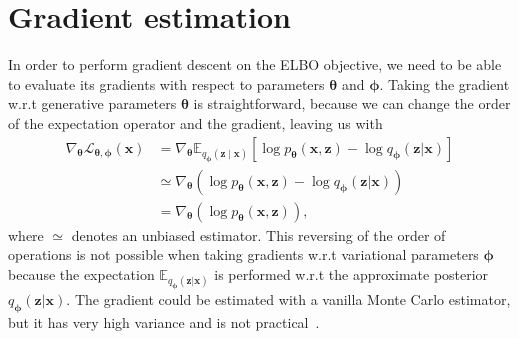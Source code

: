 
\chapter{Gradient estimation}
\label{app:grad_estim}
In order to perform gradient descent on the ELBO objective, we need to be able to evaluate its gradients with respect to parameters $\boldsymbol{\theta}$ and $\boldsymbol{\phi}$. Taking the gradient w.r.t generative parameters $\boldsymbol{\theta}$ is straightforward, because we can change the order of the expectation operator and the gradient, leaving us with
\begin{equation}
	\begin{aligned} 
		\nabla_{\boldsymbol{\theta}} \mathcal{L}_{\boldsymbol{\theta}, \boldsymbol{\phi}}(\mathbf{x}) &=\nabla_{\boldsymbol{\theta}} 	\mathbb{E}_{q_{\boldsymbol{\phi}}(\mathbf{z} \mid \mathbf{x})}\left[\log p_{\boldsymbol{\theta}}(\mathbf{x}, \mathbf{z})-\log q_{\boldsymbol{\phi}}(\mathbf{z} | \mathbf{x})\right] \\  & \simeq \nabla_{\boldsymbol{\theta}}\left(\log p_{\boldsymbol{\theta}}(\mathbf{x}, \mathbf{z})-\log q_{\boldsymbol{\phi}}(\mathbf{z} | \mathbf{x})\right) \\ &=\nabla_{\boldsymbol{\theta}}\left(\log p_{\boldsymbol{\theta}}(\mathbf{x}, \mathbf{z})\right) ,
	\end{aligned}
\end{equation}
where $\simeq$ denotes an unbiased estimator. This reversing of the order of operations is not possible when taking gradients w.r.t variational parameters $\boldsymbol{\phi}$ because the expectation $\mathbb{E}_{q_{\boldsymbol{\phi}}(\mathbf{z} | \mathbf{x})}$ is performed w.r.t the approximate posterior $q_{\boldsymbol{\phi}}(\mathbf{z} | \mathbf{x})$. The gradient could be estimated with a vanilla Monte Carlo estimator, but it has very high variance and is not practical~\cite{kingma2013auto}. 

